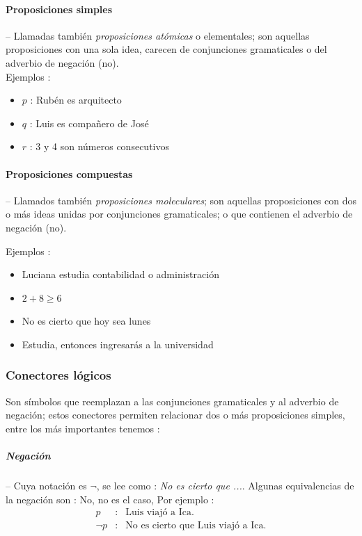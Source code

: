 \documentclass[10pt, twocolumn, landscape, a4paper]{article}
\begin{document}
\paragraph*{Proposiciones simples} -- Llamadas también \emph{proposiciones atómicas} o elementales; son aquellas proposiciones con una sola idea, carecen de conjunciones gramaticales o del adverbio de negación (no). \\

\noindent Ejemplos :
\begin{itemize}[noitemsep]
\item{$p$ : Rubén es arquitecto}
\item{$q$ : Luis es compañero de José}
\item{$r$ : 3 y 4 son números consecutivos} 
\end{itemize}

\paragraph*{Proposiciones compuestas} -- Llamados también \emph{proposiciones moleculares}; son aquellas proposiciones con dos o más ideas unidas por conjunciones gramaticales; o que contienen el adverbio de negación (no).

\noindent Ejemplos :
\begin{itemize}[noitemsep]
\item{Luciana estudia contabilidad o administración}
\item{$2 + 8 \ge 6$}
\item{No es cierto que hoy sea lunes}
\item{Estudia, entonces ingresarás a la universidad}
\end{itemize}

\subsubsection*{Conectores lógicos}
\noindent Son símbolos que reemplazan a las conjunciones gramaticales y al adverbio de negación; estos conectores permiten relacionar dos o más proposiciones simples, entre los más importantes tenemos :
\subparagraph*{Negación} -- Cuya notación es $\neg$, se lee como : \emph{No es cierto que ...}. Algunas equivalencias de la negación son : No, no es el caso,
Por ejemplo :
\begin{eqnarray*}
p &:& \text{Luis viajó a Ica}. \\
\neg p &:& \text{No es cierto que Luis viajó a Ica}.
\end{eqnarray*}
\end{document}
